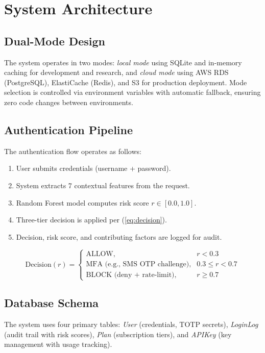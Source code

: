 \documentclass[conference]{IEEEtran}
\begin{document}
\section{System Architecture}
\subsection{Dual-Mode Design}
The system operates in two modes: \textit{local mode} using SQLite and in-memory caching for development and research, and \textit{cloud mode} using AWS RDS (PostgreSQL), ElastiCache (Redis), and S3 for production deployment. Mode selection is controlled via environment variables with automatic fallback, ensuring zero code changes between environments.

\subsection{Authentication Pipeline}
The authentication flow operates as follows:
\begin{enumerate}
\item User submits credentials (username + password).
\item System extracts 7 contextual features from the request.
\item Random Forest model computes risk score $r \in [0.0, 1.0]$.
\item Three-tier decision is applied per (\ref{eq:decision}).
\item Decision, risk score, and contributing factors are logged for audit.
\end{enumerate}

\begin{equation}
\label{eq:decision}
\text{Decision}(r) =
\begin{cases}
\text{ALLOW}, & r < 0.3 \\
\text{MFA (e.g., SMS OTP challenge)}, & 0.3 \le r < 0.7 \\
\text{BLOCK (deny + rate-limit)}, & r \ge 0.7
\end{cases}
\end{equation}

\subsection{Database Schema}
The system uses four primary tables: \textit{User} (credentials, TOTP secrets), \textit{LoginLog} (audit trail with risk scores), \textit{Plan} (subscription tiers), and \textit{APIKey} (key management with usage tracking).
\end{document}
